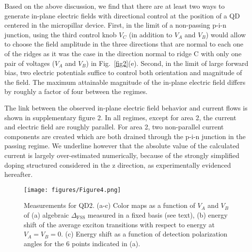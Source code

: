 \documentclass[article,twocolumn, superscriptaddress, 10pt, nofootinbib]{revtex4-1}%
\begin{document}
Based on the above discussion, we find that there are at least two ways to generate in-plane electric fields with directional control at the position of a QD centered in the micropillar device. First, in the limit of a non-passing p-i-n junction, using the third control knob $V_C$ (in addition to $V_A$ and $V_B$) would allow to choose the field amplitude in the three directions that are normal to each one of the ridges as it was the case in the direction normal to ridge C with only one pair of voltages ($V_A$ and $V_B$) in Fig.~\ref{fig2}(e).
 Second, in the limit of large forward bias, two electric potentials suffice to control both orientation and magnitude of the field. The maximum attainable magnitude of the in-plane electric field differs by roughly a factor of four between the regimes.

\noindent The link between the observed in-plane electric field behavior and current flows is shown in supplementary figure 2. In all regimes, except for area 2, the current and electric field are roughly parallel. For area 2, two  non-parallel current components are created which are both drained through the p-i-n junction in the passing regime. We underline however that the absolute value of the calculated current is largely over-estimated numerically, because of the strongly simplified doping structured considered in the z direction, as experimentally evidenced hereafter.


\begin{figure*}
    \texttt{[image: figures/Figure4.png]}
    \caption{Measurements for QD2. (a-c) Color maps as a function of $V_A$ and $V_B$ of (a) algebraic $\Delta_\text{FSS}$ measured in a fixed basis (see text), (b)  energy shift of the average exciton  transitions with respect to energy at $V_A=V_B=0$.  (c) Energy shift  as a function of detection polarization angles for the 6 points indicated in (a).}
    \label{fig4}
\end{figure*}
\end{document}
